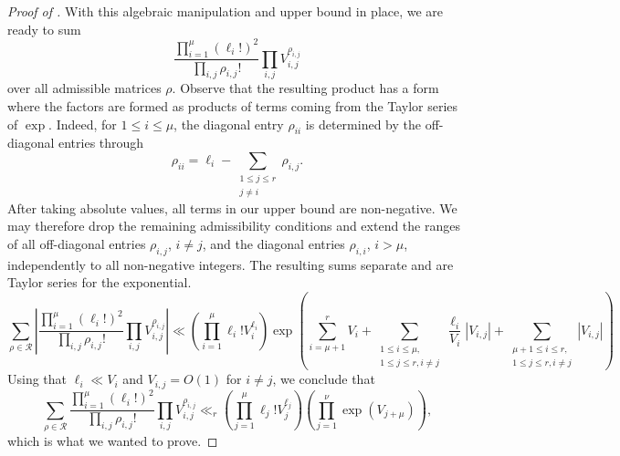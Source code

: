 \documentclass[oneside, 12pt]{amsart}
\theoremstyle{definition}
\begin{document}
\begin{proof}[Proof of ]
		With this algebraic manipulation and upper bound in place, we are ready to sum $$\frac{\prod_{i=1}^{\mu} (\ell_i!)^2}{\prod_{i,j} \rho_{i,j}!} \prod_{i,j} V_{i,j}^{\rho_{i,j}}$$ over all admissible matrices $\rho$. Observe that {the resulting product} has a form where the factors are formed as products of terms coming from the Taylor series of $\exp$. Indeed, for $1\leq i\leq \mu$, the diagonal entry $\rho_{ii}$ is determined by the off-diagonal entries through
		$$
		\rho_{ii} = \ell_i-\sum_{\substack{1\leq j\leq r\\ j\neq i}}\rho_{i,j}.$$
		After taking absolute values, all terms in our upper bound are non-negative. We may therefore drop the remaining admissibility conditions and extend the ranges of all off-diagonal entries $\rho_{i,j}$, $i\neq j$, and the diagonal entries $\rho_{i,i}$, $i>\mu$, independently to all non-negative integers. The resulting sums separate and are Taylor series for the exponential.
		$$\sum_{\rho \in \mathscr{R}}\left|\frac{\prod_{i=1}^{\mu} (\ell_i!)^2}{\prod_{i,j} \rho_{i,j}!} \prod_{i,j} V_{i,j}^{\rho_{i,j}}\right| \ll \left(\prod_{i=1}^{\mu} \ell_i! V_i^{\ell_i}\right)\exp\left(\sum_{i=\mu+1}^r V_i + \sum_{\substack{1\leq i \leq \mu, \\ 1 \leq j \leq r, i \neq j}} \frac{\ell_i}{V_i}|{V_{i,j}}| + \sum_{\substack{\mu+1 \leq i \leq r, \\ 1 \leq j \leq r, i \neq j}} |{V_{i,j}}|\right)$$
		Using that $\ell_{i} \ll V_{i}$ and ${V_{i,j}}=O(1)$ for $i\neq j$, we conclude that $$\sum_{\rho\in \mathscr{R}}\frac{\prod_{i=1}^{\mu} (\ell_i!)^2}{\prod_{i,j} \rho_{i,j}!} \prod_{i,j} V_{i,j}^{\rho_{i,j}} \ll_r \left(\prod_{j=1}^\mu \ell_j! V_j^{\ell_j}\right)\left( \prod_{j=1}^{\nu} \exp\left( V_{j+\mu}\right)\right),$$ which is what we wanted to prove.
	\end{proof}
	
\end{document}
